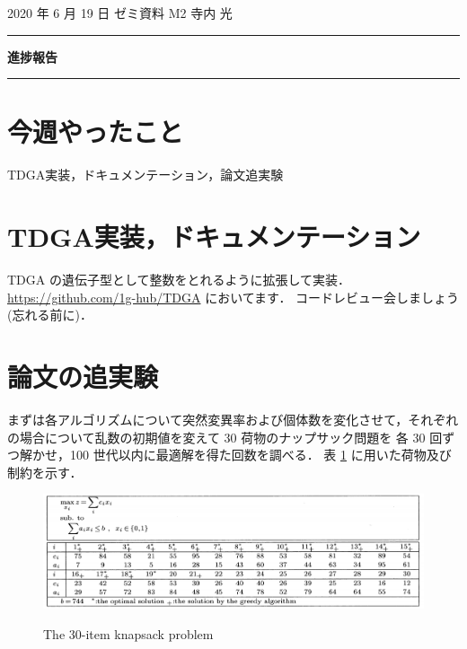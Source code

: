 \documentclass[onecolumn]{ujarticle}   %
\begin{document}
	\noindent

	\hspace{1em}
	2020 年 6 月 19 日
	ゼミ資料
	\hfill
	M2 寺内 光

	\vspace{2mm}

	\hrule

	\begin{center}
		{\Large \bf 進捗報告}
	\end{center}

	\hrule
	\vspace{3mm}

	\section{今週やったこと}
	\begin{itemize}{
		\item{TDGA実装，ドキュメンテーション，論文追実験}
	}\end{itemize}

	\section{TDGA実装，ドキュメンテーション}
	TDGA の遺伝子型として整数をとれるように拡張して実装．\url{https://github.com/1g-hub/TDGA} においてます．
	コードレビュー会しましょう(忘れる前に)．

	\section{論文の追実験}
	まずは各アルゴリズムについて突然変異率および個体数を変化させて，それぞれの場合について乱数の初期値を変えて 30 荷物のナップサック問題を 各 30 回ずつ解かせ，100 世代以内に最適解を得た回数を調べる．
	表 \ref{tab:items} に用いた荷物及び制約を示す．
	\begin{figure}[h]
		\begin{center}
			\caption{The 30-item knapsack problem}
			\includegraphics[width=1.0\columnwidth]{figure/knapsackitems.png}
			\label{tab:items}
		\end{center}
	\end{figure}
\end{document}
